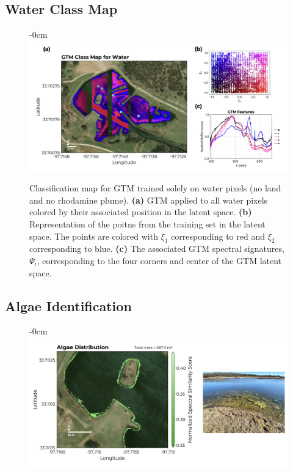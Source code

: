 \documentclass[remotesensing,article,submit,pdftex,moreauthors]{Definitions/mdpi}
\begin{document}
\subsection{Water Class Map}

\begin{figure}[t]
\begin{adjustwidth}{-\extralength}{0cm}
\centering
\includegraphics[width=18.0cm]{paper/figures/results/gtm-water.png}
\end{adjustwidth}
\caption{Classification map for GTM trained solely on water pixels (no land and no rhodamine plume). \textbf{(a)} GTM applied to all water pixels colored by their associated position in the latent space. \textbf{(b)} Representation of the poitns from the training set in the latent space. The points are colored with $\xi_1$ corresponding to red and $\xi_2$ corresponding to blue. \textbf{(c)} The associated GTM spectral signatures, $\Psi_i$, corresponding to the four corners and center of the GTM latent space. \label{fig:gtm-water}}
\end{figure}  


\subsection{Algae Identification}


\begin{figure}[t]
\begin{adjustwidth}{-\extralength}{0cm}
\centering
\includegraphics[width=15.5cm]{paper/figures/results/algae.png}
\end{adjustwidth}
\caption{\label{fig:algae-map}}
\end{figure}  
\end{document}

